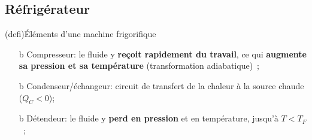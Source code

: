 \documentclass[../../main/main.tex]{subfiles}
\begin{document}
\subsection{Réfrigérateur}
\begin{tcb}(defi){Éléments d'une machine frigorifique}
	\begin{isd}
		\begin{enumerate}
			\item[b]{Compresseur}: le fluide y \textbf{reçoit rapidement du
				travail}, ce qui \textbf{augmente sa pression et sa température}
			(transformation adiabatique)~;

			\item[b]{Condenseur/échangeur}: circuit de transfert de la chaleur à
			la source chaude ($Q_C < 0$);
		\end{enumerate}
		\tcblower
		\begin{enumerate}[start=3]
			\item[b]{Détendeur}: le fluide y \textbf{perd en pression} et en
			température, jusqu'à $T < T_F$~;


\end{enumerate}
\end{isd}
\end{tcb}
\end{document}
